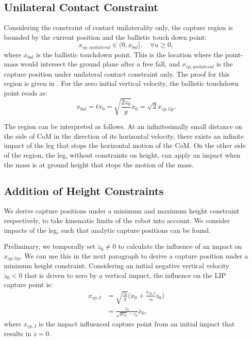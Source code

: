 \documentclass[letterpaper, 10 pt, conference]{ieeeconf}  %
\begin{document}
\subsection{Unilateral Contact Constraint}
 Considering the constraint of contact unilaterality only, the capture region is bounded by the current position and the ballistic touch down point:
\begin{equation}
	x_{cp,unilateral} \in (0, x_{bal}], \quad \forall u \geq 0, 
	\label{eq:xcpuni}
\end{equation}
where $x_{bal}$ is the ballistic touchdown point. This is the location where the point-mass would intersect the ground plane after a free fall, and $x_{cp,unilateral}$ is the capture position under unilateral contact constraint only. The proof for this region is given in \cite{koolen2016balance}. For the zero initial vertical velocity, the ballistic touchdown point reads as:
\begin{equation}
 x_{bal}=t \dot{x}_0=\sqrt{\frac{2z_0}{g}}\dot{x}_0=\sqrt{2}x_{cp,lip}.
 	\label{eq:xbal}
\end{equation}

The region can be interpreted as follows. At an infinitesimally small distance on the side of CoM in the direction of its horizontal velocity, there exists an infinite impact of the leg that stops the horizontal motion of the CoM. On the other side of the region, the leg, without constraints on height, can apply an impact when the mass is at ground height that stops the motion of the mass.
\subsection{Addition of Height Constraints}
We derive capture positions under a minimum and maximum height constraint respectively, to take kinematic limits of the robot into account. We consider impacts of the leg, such that analytic capture positions can be found. 

Preliminary, we temporally set $\dot{z}_0 \neq 0$ to calculate the influence of an impact on $x_{cp,lip}$. We can use this in the next paragraph to derive a capture position under a minimum height constraint. Considering an initial negative vertical velocity $\dot{z}_0<0$ that is driven to zero by a vertical impact, the influence on the LIP capture point is:
\begin{align}
	x_{cp,I} &= \sqrt{\frac{z_0}{g}}\Big(\dot{x}_0 + \frac{x_{cp,I}}{z_0}\dot{z}_0\Big)\\
	&=\frac{z_0}{\sqrt{gz_0}-\dot{z}_0}\dot{x}_0, \label{eq:xcpimpact}
\end{align}
where $x_{cp,I}$ is the impact influenced capture point from an initial impact that results in $\dot{z}=0$.
\end{document}
